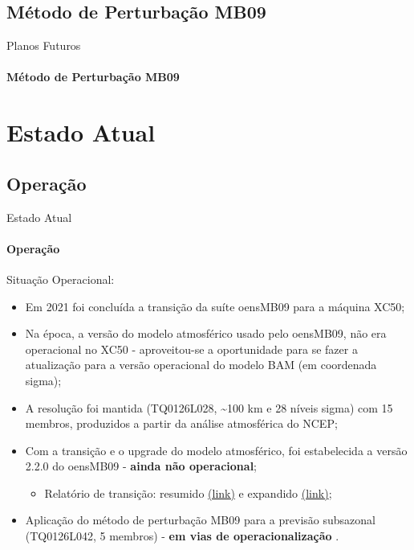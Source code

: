 \documentclass[10pt,aspectratio=169]{beamer}
\begin{document}
\subsection{Método de Perturbação MB09}

 \begin{frame}{Planos Futuros}
 \framesubtitle{Método de Perturbação MB09}
 \vspace{-1em}
 \begin{figure}[t]
   \centering
   
 \end{figure}
 \end{frame}

\section{Estado Atual}

\subsection{Operação}

\begin{frame}{Estado Atual}
	\framesubtitle{Operação}
    \begin{block}{Situação Operacional:}
    	\begin{itemize}
    		\item Em 2021 foi concluída a transição da suíte oensMB09 para a máquina XC50;
    		\pause
			\item Na época, a versão do modelo atmosférico usado pelo oensMB09, não era operacional no XC50 - aproveitou-se a oportunidade para se fazer a atualização para a versão operacional do modelo BAM (em coordenada sigma);
			\pause
			\item A resolução foi mantida (TQ0126L028, \textasciitilde100 km e 28 níveis sigma) com 15 membros, produzidos a partir da análise atmosférica do NCEP;
			\pause
			\item Com a transição e o upgrade do modelo atmosférico, foi estabelecida a versão 2.2.0 \cite{figueroaetal/2016} do oensMB09 - \textbf{ainda não operacional};
			\begin{itemize}
				\item Relatório de transição: resumido \href{https://s0.cptec.inpe.br/webcptec/sites/dmd/Avalia\%C3\%A7\%C3\%A3o-Modelo-Ensemble-Global-v1.1-2021.pdf}{(\faFile[regular] link)} e expandido \href{https://www.dropbox.com/s/je8q92jpwzc1bnz/16.\%20Relat\%C3\%B3rio\%20-\%20Bastarz\%20et\%20al.\%2C\%202021.pdf?dl=0}{(\faFile[regular] link)};
			\end{itemize}
			\item Aplicação do método de perturbação MB09 para a previsão subsazonal (TQ0126L042, 5 membros) - \textbf{em vias de operacionalização} \cite{guimaraes/2020, guimaraes/2021}.
    	\end{itemize}
    \end{block}
\end{frame}
\end{document}
